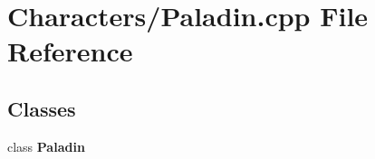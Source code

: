 \section{Characters/\-Paladin.cpp File Reference}
\label{_paladin_8cpp}
\subsection*{Classes}
\begin{DoxyCompactItemize}
\item 
class {\bf Paladin}
\end{DoxyCompactItemize}
